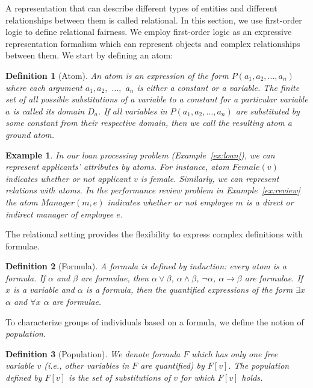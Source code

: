 \documentclass[11pt]{article}
\newtheorem{mydef}{\textbf{Definition}}
\newtheorem{myex}{\textbf{Example}}
\begin{document}
A representation that can describe different types of entities and different relationships between them is called relational. In this section, we use first-order logic to define relational fairness. We employ first-order logic as an expressive representation formalism which can represent objects and complex relationships between them. We start by defining an atom:

\begin{mydef}[Atom]
An atom is an expression of the form $P(a_1, a_2, \ldots, a_n)$ where each argument $a_1, a_2,$ $\ldots,$ $a_n$ is either a constant or a variable. The finite set of all possible substitutions of a variable to a constant for a particular variable $a$ is called its \textit{domain} $D_{a}$. If all variables in $P(a_1, a_2, \ldots, a_n)$ are substituted by some constant from their respective domain, then we call the resulting atom a \textit{ground atom}. 
\end{mydef}

\begin{myex}
In our loan processing problem (Example~\ref{ex:loan}), we can represent applicants' attributes by atoms. For instance, atom $Female(v)$ indicates whether or not applicant $v$ is female. Similarly, we can represent relations with atoms. In the performance review problem in Example~\ref{ex:review} the atom $Manager(m,e)$ indicates whether or not employee $m$ is a direct or indirect manager of employee $e$.
\end{myex}

The relational setting provides the flexibility to express complex definitions with formulae.

\begin{mydef}[Formula] 
A formula is defined by induction: every atom is a formula. If $\alpha$ and $\beta$ are formulae, then $\alpha \vee \beta$, $\alpha \wedge \beta$, $\neg \alpha$, $\alpha \rightarrow \beta$ are formulae. If $x$ is a variable and $\alpha$ is a formula, then the quantified expressions of the form $\exists x$ $\alpha$ and $\forall x$ $\alpha$ are formulae.    
\end{mydef}

To characterize groups of individuals based on a formula, we define the notion of \emph{population}.

\begin{mydef}[Population]
We denote formula $F$ which has only one free variable $v$ (i.e., other variables in $F$ are quantified) by $F[v]$. The population defined by $F[v]$ is the set of substitutions of $v$ for which $F[v]$ holds.   
\end{mydef}
\end{document}
